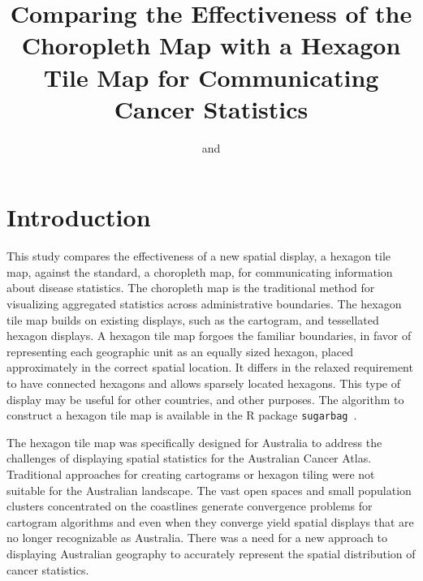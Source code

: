 \documentclass[journal]{vgtc}                     %
\title{Comparing the Effectiveness of the Choropleth Map with a Hexagon Tile Map for Communicating Cancer Statistics}
\author{%
  \authororcid{Stephanie Kobakian}{0000-0002-4616-0048}
  and 
  \authororcid{Dianne Cook}{0000-0002-3813-7155}
}
\begin{document}
\maketitle


%


\hypertarget{introduction}{%
\section{Introduction}\label{introduction}}

This study compares the effectiveness of a new spatial display, a hexagon tile map, against the standard, a choropleth map, for communicating information about disease statistics. The choropleth map is the traditional method for visualizing aggregated statistics across administrative boundaries. The hexagon tile map builds on existing displays, such as the cartogram, and tessellated hexagon displays. A hexagon tile map forgoes the familiar boundaries, in favor of representing each geographic unit as an equally sized hexagon, placed approximately in the correct spatial location. It differs in the relaxed requirement to have connected hexagons and allows sparsely located hexagons. This type of display may be useful for other countries, and other purposes. The algorithm to construct a hexagon tile map is available in the R package \texttt{sugarbag}~\cite{sugarbag}.

The hexagon tile map was specifically designed for Australia to address the challenges of displaying spatial statistics for the Australian Cancer Atlas. Traditional approaches for creating cartograms or hexagon tiling were not suitable for the Australian landscape. The vast open spaces and small population clusters concentrated on the coastlines generate convergence problems for cartogram algorithms and even when they converge yield spatial displays that are no longer recognizable as Australia. There was a need for a new approach to displaying Australian geography to accurately represent the spatial distribution of cancer statistics. 
\end{document}
